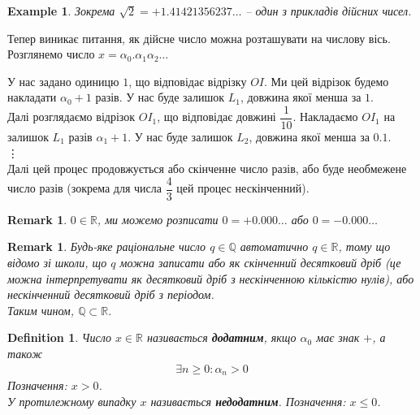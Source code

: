 \documentclass[a4paper, 14pt]{article}
\theoremstyle{theoremdd}
\theoremstyle{theoremdd}
\newtheorem{definition}[theorem]{Definition}
\theoremstyle{theoremdd}
\theoremstyle{theoremdd}
\newtheorem{example}[theorem]{Example}
\theoremstyle{theoremdd}
\theoremstyle{theoremdd}
\newtheorem{remark}[theorem]{Remark}
\theoremstyle{theoremdd}
\theoremstyle{theoremdd}
\begin{document}
	\begin{example}
	Зокрема $\sqrt{2} = +1.41421356237 \dots$ -- один з прикладів дійсних чисел.
	\end{example}
	
	Тепер виникає питання, як дійсне число можна розташувати на числову вісь.\\
	Розглянемо число $x = \alpha_0.\alpha_1\alpha_2 \dots$
	\begin{figure}[H]
	\centering
	\end{figure}
	У нас задано одиницю $1$, що відповідає відрізку $OI$. Ми цей відрізок будемо накладати $\alpha_0 + 1$ разів. У нас буде залишок $L_1$, довжина якої менша за $1$.\\
	Далі розглядаємо відрізок $OI_1$, що відповідає довжині $\dfrac{1}{10}$. Накладаємо $OI_1$ на залишок $L_1$ разів $\alpha_1 + 1$. У нас буде залишок $L_2$, довжина якої менша за $0.1$.\\
	\vdots \\
	Далі цей процес продовжується або скінченне число разів, або буде необмежене число разів (зокрема для числа $\dfrac{4}{3}$ цей процес нескінченний).
	
	\begin{remark}
	$0 \in \mathbb{R}$, ми можемо розписати $0 = +0.000 \dots$ або $0 = -0.000 \dots$
	\end{remark}
	
	\begin{remark}
	Будь-яке раціональне число $q \in \mathbb{Q}$ автоматично $q \in \mathbb{R}$, тому що відомо зі школи, що $q$ можна записати або як скінченний десятковий дріб (це можна інтерпретувати як десятковий дріб з нескінченною кількістю нулів), або нескінченний десятковий дріб з періодом.\\
	Таким чином, $\mathbb{Q} \subset \mathbb{R}$.
	\end{remark}
	
	\begin{definition}
	Число $x \in \mathbb{R}$ називається \textbf{додатним}, якщо $\alpha_0$ має знак $+$, а також
	\begin{align*}
	\exists n \geq 0: \alpha_n > 0
	\end{align*}
	Позначення: $x > 0$.\\
	У протилежному випадку $x$ називається \textbf{недодатним}. Позначення: $x \leq 0$.
	\end{definition}
	
\end{document}
